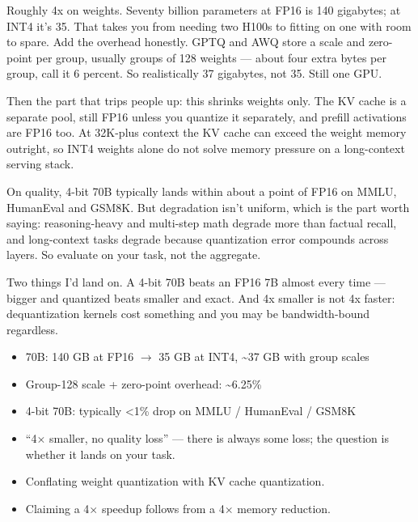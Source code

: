 \documentclass[10pt,twoside]{book}
\newcommand{\lab}[1]{\par\vspace{5pt}\noindent{\sffamily\footnotesize\bfseries\color{accent}#1}\par\vspace{1pt}}
\newcommand{\flab}[1]{\par\vspace{5pt}\noindent{\sffamily\footnotesize\bfseries\color{flag}#1}\par\vspace{1pt}}
\begin{document}
\lab{Say this}
Roughly 4x on weights. Seventy billion parameters at FP16 is 140 gigabytes; at INT4 it's 35. That takes you from needing two H100s to fitting on one with room to spare. Add the overhead honestly. GPTQ and AWQ store a scale and zero-point per group, usually groups of 128 weights --- about four extra bytes per group, call it 6 percent. So realistically 37 gigabytes, not 35. Still one GPU.\par\vspace{3pt}
Then the part that trips people up: this shrinks weights only. The KV cache is a separate pool, still FP16 unless you quantize it separately, and prefill activations are FP16 too. At 32K-plus context the KV cache can exceed the weight memory outright, so INT4 weights alone do not solve memory pressure on a long-context serving stack.\par\vspace{3pt}
On quality, 4-bit 70B typically lands within about a point of FP16 on MMLU, HumanEval and GSM8K. But degradation isn't uniform, which is the part worth saying: reasoning-heavy and multi-step math degrade more than factual recall, and long-context tasks degrade because quantization error compounds across layers. So evaluate on your task, not the aggregate.\par\vspace{3pt}
Two things I'd land on. A 4-bit 70B beats an FP16 7B almost every time --- bigger and quantized beats smaller and exact. And 4x smaller is not 4x faster: dequantization kernels cost something and you may be bandwidth-bound regardless.\par\vspace{3pt}
\lab{Numbers}
\begin{itemize}
\item 70B: 140 GB at FP16 $\to$ 35 GB at INT4, \textasciitilde{}37 GB with group scales
\item Group-128 scale + zero-point overhead: \textasciitilde{}6.25\%
\item 4-bit 70B: typically <1\% drop on MMLU / HumanEval / GSM8K
\end{itemize}
\flab{Loses the signal}
\begin{itemize}
\item ``4$\times$ smaller, no quality loss'' --- there is always some loss; the question is whether it lands on your task.
\item Conflating weight quantization with KV cache quantization.
\item Claiming a 4$\times$ speedup follows from a 4$\times$ memory reduction.
\end{itemize}
\end{document}
